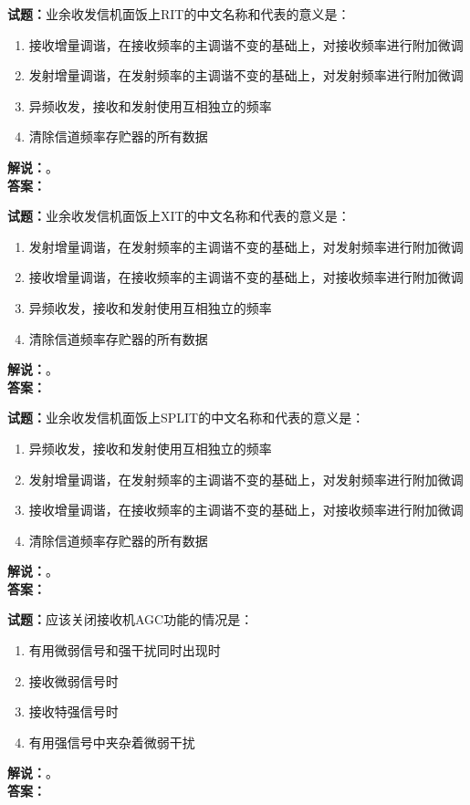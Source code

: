 \documentclass{ctexbook}
\begin{document}
\bigskip




\noindent\textbf{试题：}业余收发信机面饭上RIT的中文名称和代表的意义是：
\begin{enumerate}[leftmargin=3em]
\item 接收增量调谐，在接收频率的主调谐不变的基础上，对接收频率进行附加微调
\item 发射增量调谐，在发射频率的主调谐不变的基础上，对发射频率进行附加微调
\item 异频收发，接收和发射使用互相独立的频率
\item 清除信道频率存贮器的所有数据
\end{enumerate}
\noindent\textbf{解说：}\textbf{}。\\\noindent\textbf{答案：}

\bigskip




\noindent\textbf{试题：}业余收发信机面饭上XIT的中文名称和代表的意义是：
\begin{enumerate}[leftmargin=3em]
\item 发射增量调谐，在发射频率的主调谐不变的基础上，对发射频率进行附加微调
\item 接收增量调谐，在接收频率的主调谐不变的基础上，对接收频率进行附加微调
\item 异频收发，接收和发射使用互相独立的频率
\item 清除信道频率存贮器的所有数据
\end{enumerate}
\noindent\textbf{解说：}\textbf{}。\\\noindent\textbf{答案：}

\bigskip




\noindent\textbf{试题：}业余收发信机面饭上SPLIT的中文名称和代表的意义是：
\begin{enumerate}[leftmargin=3em]
\item 异频收发，接收和发射使用互相独立的频率
\item 发射增量调谐，在发射频率的主调谐不变的基础上，对发射频率进行附加微调
\item 接收增量调谐，在接收频率的主调谐不变的基础上，对接收频率进行附加微调
\item 清除信道频率存贮器的所有数据
\end{enumerate}
\noindent\textbf{解说：}\textbf{}。\\\noindent\textbf{答案：}

\bigskip




\noindent\textbf{试题：}应该关闭接收机AGC功能的情况是：
\begin{enumerate}[leftmargin=3em]
\item 有用微弱信号和强干扰同时出现时
\item 接收微弱信号时
\item 接收特强信号时
\item 有用强信号中夹杂着微弱干扰
\end{enumerate}
\noindent\textbf{解说：}\textbf{}。\\\noindent\textbf{答案：}
\end{document}
